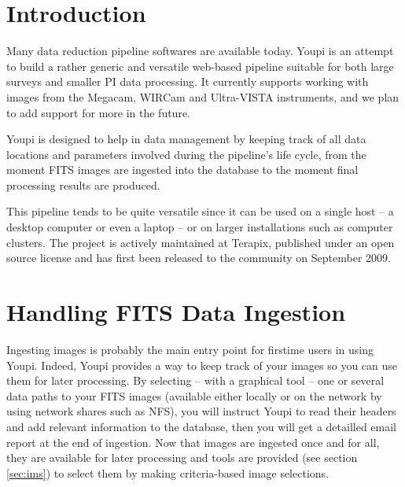 \documentclass[11pt,twoside]{article}  %
\begin{document}

\section{Introduction}

Many data reduction pipeline softwares are available today. Youpi is an attempt to
build a rather generic and versatile web-based pipeline suitable for both large 
surveys and smaller PI data processing. It currently supports working with images 
from the Megacam, WIRCam and Ultra-VISTA instruments, and we plan to add support 
for more in the future. 

Youpi is designed to help in data management by keeping track of all data locations 
and parameters involved during the pipeline's life cycle, from the moment FITS images 
are ingested into the database to the moment final processing results are produced.

This pipeline tends to be quite versatile since it can be used on a single host -- a 
desktop computer or even a laptop -- or on larger installations such as computer 
clusters. The project is actively maintained at Terapix, published under an open 
source license and has first been released to the community on September 2009.

\section{Handling FITS Data Ingestion}

Ingesting images is probably the main entry point for firstime users in using Youpi.
Indeed, Youpi provides a way to keep track of your images so you can use them for later 
processing. By selecting -- with a graphical tool --
one or several data paths to your FITS images (available either locally or on the 
network by using network shares such as NFS), you will instruct Youpi to read their 
headers and add relevant information to the database, then you will get a detailled 
email report at the end of ingestion. Now that images are ingested once and for all, 
they are available for later processing and tools are provided (see section \ref{sec:ims}) 
to select them by making criteria-based image selections.
\end{document}
